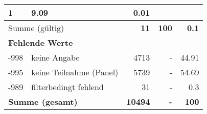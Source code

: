 \begin{longtable}{lXrrr}
       \num{1} &
       \num[round-mode=places,round-precision=2]{9.09} &
         \num[round-mode=places,round-precision=2]{0.01} \\
     \midrule
     \multicolumn{2}{l}{Summe (gültig)} &
       \textbf{\num{11}} &
     \textbf{\num{100}} &
       \textbf{\num[round-mode=places,round-precision=2]{0.1}} \\
     \multicolumn{5}{l}{\textbf{Fehlende Werte}}\\
       -998 &
       keine Angabe &
         \num{4713} &
        - &
         \num[round-mode=places,round-precision=2]{44.91} \\
       -995 &
       keine Teilnahme (Panel) &
         \num{5739} &
        - &
         \num[round-mode=places,round-precision=2]{54.69} \\
       -989 &
       filterbedingt fehlend &
         \num{31} &
        - &
         \num[round-mode=places,round-precision=2]{0.3} \\
     \midrule
     \multicolumn{2}{l}{\textbf{Summe (gesamt)}} &
          \textbf{\num{10494}} &
        \textbf{-} &
        \textbf{\num{100}} \\
     \bottomrule
     \end{longtable}
     
